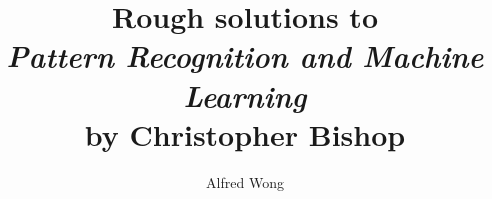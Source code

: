 \documentclass{article}
\title{Rough solutions to\\\textit{Pattern Recognition and Machine Learning}\\by Christopher Bishop}
\author{Alfred Wong}
\date{\vspace{-\baselineskip}}
\begin{document}
\maketitle
\pagebreak
\tableofcontents
\pagebreak
\end{document}

